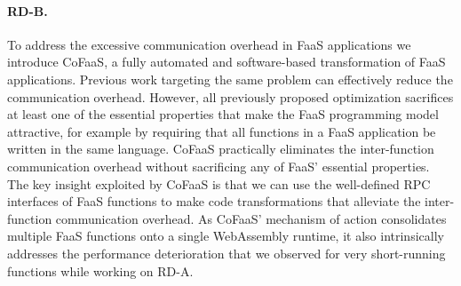 \documentclass[../main.tex]{subfiles}
\begin{document}
\begin{refsection}
\paragraph{RD-B.} To address the excessive communication overhead in FaaS
  applications we introduce CoFaaS, a fully automated and
  software-based transformation of FaaS applications. Previous work
  targeting the same problem can effectively reduce the communication
  overhead. However, all previously proposed optimization sacrifices
  at least one of the essential properties that make the FaaS
  programming model attractive, for example by requiring that all
  functions in a FaaS application be written in the same
  language. CoFaaS practically eliminates the inter-function
  communication overhead without sacrificing any of FaaS' essential
  properties. The key insight exploited by CoFaaS is that we can use
  the well-defined RPC interfaces of FaaS functions to make code
  transformations that alleviate the inter-function communication
  overhead. As CoFaaS' mechanism of action consolidates multiple FaaS
  functions onto a single WebAssembly runtime, it also intrinsically
  addresses the performance deterioration that we observed for very
  short-running functions while working on RD-A.





 


\ifx\chapincluded\undefined
  \printbibliography
  \end{refsection}
 \fi
\end{document}
